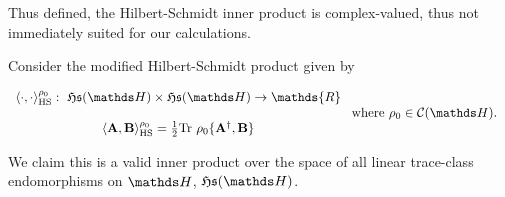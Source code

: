 \documentclass{homework}
\begin{document}
Thus defined, the Hilbert-Schmidt inner product is complex-valued, thus not immediately suited for our calculations.

\begin{theo}
Consider the modified Hilbert-Schmidt product given by 
 
 \begin{align*}
 \begin{array}{c}
    \langle \cdot , \cdot \rangle_{\textnormal{HS}}^{\rho_0}: \blanky \mathfrak{H}\mathfrak{s}(\hilbert) \times \mathfrak{H}\mathfrak{s}(\hilbert) \rightarrow \mathds{R} \\
    \\
    \langle {\bf A}, {\bf B} \rangle_{\textnormal{HS}}^{\rho_0} = \frac{1}{2}\textnormal{Tr } \rho_0 \bf \{A^\dagger, {\bf B}\}
 \end{array} & \textnormal{ where } \rho_0 \in \statespace.
\end{align*}

We claim this is a valid inner product over the space of all linear trace-class endomorphisms on $\hilbert$, $\mathfrak{H}\mathfrak{s}(\hilbert)$.
\end{theo}
\end{document}
